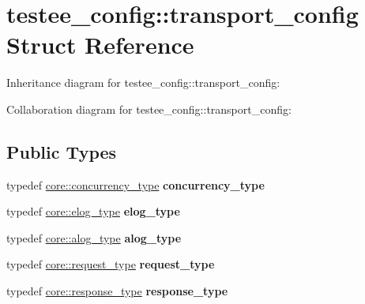 \hypertarget{structtestee__config_1_1transport__config}{}\section{testee\+\_\+config\+:\+:transport\+\_\+config Struct Reference}
\label{structtestee__config_1_1transport__config}


Inheritance diagram for testee\+\_\+config\+:\+:transport\+\_\+config\+:


Collaboration diagram for testee\+\_\+config\+:\+:transport\+\_\+config\+:
\subsection*{Public Types}
\begin{DoxyCompactItemize}
\item 
\mbox{\label{structtestee__config_1_1transport__config_a3e5f3f833879358cf0847b941dce20d7}} 
typedef \mbox{\hyperlink{classwebsocketpp_1_1concurrency_1_1basic}{core\+::concurrency\+\_\+type}} {\bfseries concurrency\+\_\+type}
\item 
\mbox{\label{structtestee__config_1_1transport__config_a710f854c150d2e7264da4dcb41b71164}} 
typedef \mbox{\hyperlink{classwebsocketpp_1_1log_1_1basic}{core\+::elog\+\_\+type}} {\bfseries elog\+\_\+type}
\item 
\mbox{\label{structtestee__config_1_1transport__config_a471dcc3d893b6aa978c6cb4de3dcff39}} 
typedef \mbox{\hyperlink{classwebsocketpp_1_1log_1_1basic}{core\+::alog\+\_\+type}} {\bfseries alog\+\_\+type}
\item 
\mbox{\label{structtestee__config_1_1transport__config_aafcf1a7ce41624ff4510b831dd33cea4}} 
typedef \mbox{\hyperlink{classwebsocketpp_1_1http_1_1parser_1_1request}{core\+::request\+\_\+type}} {\bfseries request\+\_\+type}
\item 
\mbox{\label{structtestee__config_1_1transport__config_a16f9f3b90d5d958b851c46916c464d6f}} 
typedef \mbox{\hyperlink{classwebsocketpp_1_1http_1_1parser_1_1response}{core\+::response\+\_\+type}} {\bfseries response\+\_\+type}
\end{DoxyCompactItemize}
